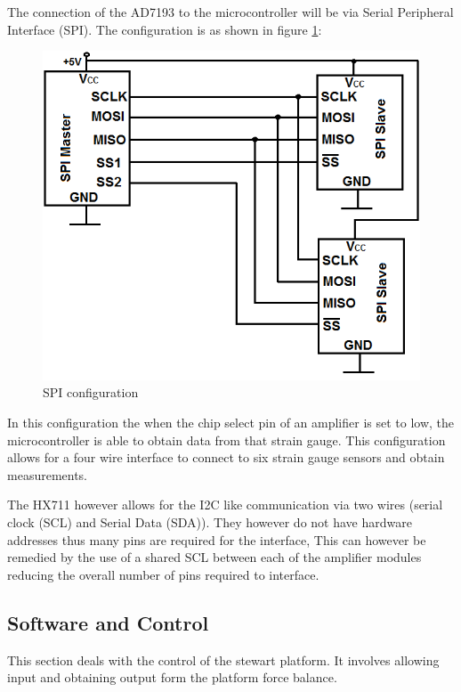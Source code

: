 The connection of the AD7193 to the microcontroller will be via Serial Peripheral Interface (SPI). The configuration is as shown in figure \ref{spi}:
\begin{center}
\begin{figure}[H]
\centering
\includegraphics[width=0.55\linewidth]{Figures/SPI}
\caption[SPI configuration]{SPI configuration}
\label{spi}
\end{figure}
\end{center}
In this configuration the when the chip select pin of an amplifier is set to low, the microcontroller is able to obtain data from that strain gauge. This configuration allows for a four wire interface to connect to six strain gauge sensors and obtain measurements.

The HX711 however allows for the I2C like communication via two wires (serial clock (SCL) and Serial Data (SDA)). They however do not have hardware addresses thus many pins are required for the interface, This can however be remedied by the use of a shared SCL between each of the amplifier modules reducing the overall number of pins required to interface.

\subsection{Software and Control}
This section deals with the control of the stewart platform. It involves allowing input and obtaining output form the platform force balance.
